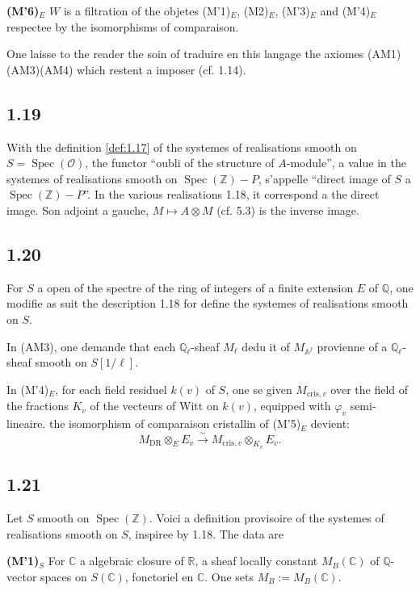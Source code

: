 \documentclass[12pt,a4paper]{article}
\theoremstyle{plain}
\theoremstyle{definition}
\theoremstyle{remark}
\DeclareMathOperator{\Spec}{Spec}
\providecommand{\Spec}{\operatorname{Spec}}
\providecommand{\DR}{\mathrm{DR}}
\providecommand{\cris}{\mathrm{cris}}
\begin{document}
\textbf{(M'6)$_E$} $W$ is a filtration of the objetes (M'1)$_E$, (M2)$_E$,
(M'3)$_E$ and (M'4)$_E$ respectee by the isomorphisms of comparaison.

One laisse to the reader the soin of traduire en this langage the axiomes (AM1)(AM3)(AM4)
which restent a imposer (cf. 1.14).

\subsection*{1.19}

With the definition \ref{def:1.17} of the systemes of realisations smooth on
$S = \Spec(\mathcal{O})$, the functor ``oubli of the structure of $A$-module'', a
value in the systemes of realisations smooth on $\Spec(\mathbb{Z}) - P$, s'appelle
``direct image of $S$ a $\Spec(\mathbb{Z}) - P$''. In the various realisations
1.18, it correspond a the direct image. Son adjoint a gauche, $M \mapsto A \otimes M$
(cf. 5.3) is the inverse image.

\subsection*{1.20}

For $S$ a open of the spectre of the ring of integers of a finite extension $E$ of
$\mathbb{Q}$, one modifie as suit the description 1.18 for define the systemes of
realisations smooth on $S$.

In (AM3), one demande that each $\mathbb{Q}_\ell$-sheaf $M_\ell$ dedu it of
$M_{\mathbb{A}^f}$ provienne of a $\mathbb{Q}_\ell$-sheaf smooth on $S[1/\ell]$.

In (M'4)$_E$, for each field residuel $k(v)$ of $S$, one se given
$M_{\cris,v}$ over the field of the fractions $K_v$ of the vecteurs of Witt on $k(v)$, equipped with
$\varphi_v$ semi-lineaire. the isomorphism of comparaison cristallin of (M'5)$_E$
devient:
\[
M_{\DR} \otimes_E E_v \xrightarrow{\sim} M_{\cris,v} \otimes_{K_v} E_v.
\]

\subsection*{1.21}

Let $S$ smooth on $\Spec(\mathbb{Z})$. Voici a definition provisoire of the systemes
of realisations smooth on $S$, inspiree by 1.18. The data are

\textbf{(M'1)$_S$} For $\mathbb{C}$ a algebraic closure of $\mathbb{R}$, a sheaf
locally constant $M_B(\mathbb{C})$ of $\mathbb{Q}$-vector spaces on
$S(\mathbb{C})$, fonctoriel en $\mathbb{C}$. One sets $M_B := M_B(\mathbb{C})$.
\end{document}
